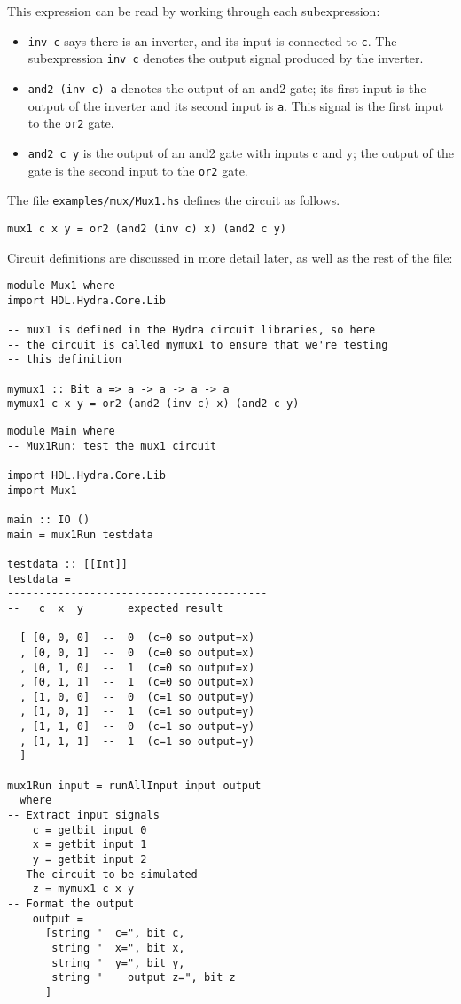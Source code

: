 \documentclass[11pt]{article}
\begin{document}
This expression can be read by working through each subexpression:
\begin{itemize}
\item \texttt{inv c} says there is an inverter, and its input is connected to
\texttt{c}.  The subexpression \texttt{inv c} denotes the output signal produced
by the inverter.
\item \texttt{and2 (inv c) a} denotes the output of an and2 gate; its first input
is the output of the inverter and its second input is \texttt{a}.  This
signal is the first input to the \texttt{or2} gate.
\item \texttt{and2 c y} is the output of an and2 gate with inputs c and y; the
output of the gate is the second input to the \texttt{or2} gate.
\end{itemize}

The file \texttt{examples/mux/Mux1.hs} defines the circuit as follows.

\begin{verbatim}
mux1 c x y = or2 (and2 (inv c) x) (and2 c y)
\end{verbatim}

Circuit definitions are discussed in more detail later, as well as the
rest of the file:

\begin{verbatim}
module Mux1 where
import HDL.Hydra.Core.Lib

-- mux1 is defined in the Hydra circuit libraries, so here
-- the circuit is called mymux1 to ensure that we're testing
-- this definition

mymux1 :: Bit a => a -> a -> a -> a
mymux1 c x y = or2 (and2 (inv c) x) (and2 c y)
\end{verbatim}

\begin{verbatim}
module Main where
-- Mux1Run: test the mux1 circuit

import HDL.Hydra.Core.Lib
import Mux1

main :: IO ()
main = mux1Run testdata

testdata :: [[Int]]
testdata =
-----------------------------------------
--   c  x  y       expected result
-----------------------------------------
  [ [0, 0, 0]  --  0  (c=0 so output=x)
  , [0, 0, 1]  --  0  (c=0 so output=x)
  , [0, 1, 0]  --  1  (c=0 so output=x)
  , [0, 1, 1]  --  1  (c=0 so output=x)
  , [1, 0, 0]  --  0  (c=1 so output=y)
  , [1, 0, 1]  --  1  (c=1 so output=y)
  , [1, 1, 0]  --  0  (c=1 so output=y)
  , [1, 1, 1]  --  1  (c=1 so output=y)
  ]

mux1Run input = runAllInput input output
  where
-- Extract input signals  
    c = getbit input 0
    x = getbit input 1
    y = getbit input 2
-- The circuit to be simulated
    z = mymux1 c x y
-- Format the output
    output =
      [string "  c=", bit c,
       string "  x=", bit x,
       string "  y=", bit y,
       string "    output z=", bit z
      ]
\end{verbatim}
\end{document}
